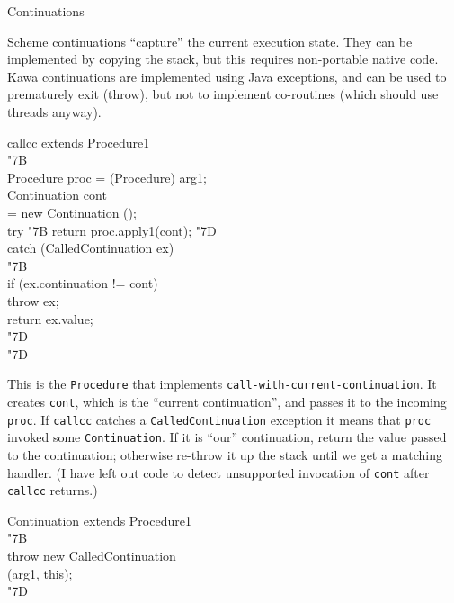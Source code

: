\documentclass[twocolumn]{article}
\makeatletter
\def\section{\@startsection {section}{1}{\z@}
   {14pt plus 2pt minus 2pt}{12pt plus 2pt minus 2pt} {\large\bf}}
\newcommand{\LBr}{\char"7B}
\newcommand{\RBr}{\char"7D}
\newcommand{\Tab}{\>}
\makeatother
\begin{document}
\section{Continuations}

Scheme continuations ``capture'' the current execution
state.  They can be implemented by copying the stack, but
this requires non-portable native code.  Kawa continuations
are implemented using Java exceptions, and can be used to
prematurely exit (throw), but not to implement co-routines
(which should use threads anyway).

\begin{Class}{callcc}{ extends Procedure1}
\\
\LBr\+\\
    Procedure proc = (Procedure) arg1;\\
    Continuation cont\\
    \Tab = new Continuation ();\\
    try {\LBr} return proc.apply1(cont); \RBr\\
    catch (CalledContinuation ex)\\
      \LBr\+\\
        if (ex.continuation != cont)\\
          \Tab throw ex;  \\
        return ex.value;\-\\
      \RBr\-\\
\RBr\\
\end{Class}

This is the {\tt Procedure} that implements
{\tt call-with-\discretionary{}{}{}current-\discretionary{}{}{}continuation}.
It creates {\tt cont}, which is the ``current continuation'',
and passes it to the incoming {\tt proc}.
If {\tt callcc} catches a {\tt CalledContinuation} exception it means
that {\tt proc} invoked some {\tt Continuation}.  If it is ``our''
continuation, return the value passed to the continuation;  otherwise
re-throw it up the stack until we get a matching handler.
(I have left out code to detect unsupported invocation of {\tt cont}
after {\tt callcc} returns.)

\begin{Class}{Continuation}{ extends Procedure1}
\\
\LBr\+\\
    throw new CalledContinuation\\
	\Tab\Tab (arg1, this);\-\\
\RBr\\
\end{Class}
\end{document}

